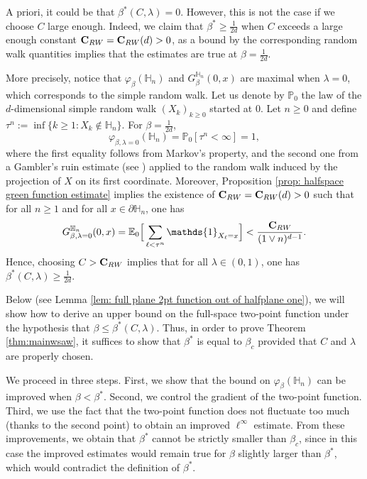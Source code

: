 \documentclass[11pt,a4paper]{article}
\numberwithin{equation}{section}
\theoremstyle{plain}
\theoremstyle{definition}
\newcommand\bfC{\mathbf{C}}
\begin{document}
 A priori, it could be that $\beta^*(C,\lambda)=0$. However, this is not the case if we choose $C$ large enough.
Indeed, we claim that $\beta^*\ge \tfrac1{2d}$ when $C$ exceeds a large enough constant $\bfC_{\rm RW}=\bfC_{\rm RW}(d)>0$, as a bound by the corresponding random walk quantities implies that the estimates are true at $\beta=\frac1{2d}$.

 More precisely, notice that $\varphi_\beta(\mathbb H_n)$ and $G_\beta^{\mathbb H_n}(0,x)$ are maximal when $\lambda=0$, which corresponds to the simple random walk. Let us denote by $\mathbb P_0$ the law of the $d$-dimensional simple random walk $(X_k)_{k\geq 0}$ started at $0$. Let $n\geq 0$ and define $\tau^n:=\inf\{k\geq 1: X_k\notin \mathbb H_n\}$. For $\beta=\tfrac{1}{2d}$,
 \begin{equation}\label{eq:phi beta rw =1}
 	\varphi_{\beta,\lambda=0}(\mathbb H_n)=\mathbb P_0[\tau^n<\infty]=1,
 \end{equation}
 where the first equality follows from Markov's property, and the second one from a Gambler's ruin estimate (see \cite[Theorem~5.1.7]{LawlerLimicRandomWalks2010}) applied to the random walk induced by the projection of $X$ on its first coordinate. Moreover, Proposition \ref{prop: halfspace green function estimate} implies the existence of $\bfC_{\rm RW}=\bfC_{\rm RW}(d)>0$ such that for all $n\geq 1$ and for all $x \in \partial \mathbb H_n$, one has 
 \begin{equation}
 	G_{\beta,\lambda=0}^{\mathbb H_n}(0,x)=\mathbb E_0\Big[\sum_{\ell<\tau^n}\mathds{1}_{X_\ell=x}\Big]<\frac{\bfC_{\rm RW}}{(1\vee n)^{d-1}}.
 \end{equation}
Hence, choosing $C>\bfC_{\rm RW}$ implies that for all $\lambda\in(0,1)$, one has $\beta^*(C,\lambda)\geq \tfrac{1}{2d}$. 


Below (see Lemma \ref{lem: full plane 2pt function out of halfplane one}), we will show how to derive an upper bound on the full-space two-point function under the hypothesis that $\beta\leq \beta^*(C,\lambda)$. Thus, in order to prove Theorem \ref{thm:mainwsaw}, it suffices to show that $\beta^*$ is equal to $\beta_c$ provided that $C$ and $\lambda$ are properly chosen. 

We proceed in three steps. First, we show that the bound on $\varphi_\beta(\mathbb H_n)$ can be improved when $\beta<\beta^*$.  Second, we control the gradient of the two-point function. Third, we use the fact that the two-point function does not fluctuate too much (thanks to the second point) to obtain an improved $\ell^\infty$ estimate. From these improvements, we obtain that $\beta^*$ cannot be strictly smaller than $\beta_c$, since in this case the improved estimates would remain true for $\beta$ slightly larger than $\beta^*$, which would contradict the definition of $\beta^*$.
\end{document}
